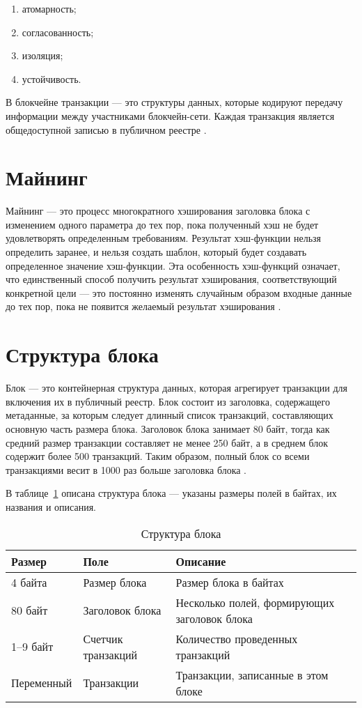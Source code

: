 \begin{enumerate}
\item[1)]
атомарность;
\item[2)]
согласованность;
\item[3)]
изоляция;
\item[4)]
устойчивость.
\end{enumerate}

В блокчейне транзакции --- это структуры данных, которые кодируют передачу информации между участниками блокчейн-сети. 
Каждая транзакция является общедоступной записью в публичном реестре \cite[111]{Antonopoulos2010}.

\section{Майнинг}

Майнинг --- это процесс многократного хэширования заголовка блока с изменением одного параметра до тех пор, пока полученный хэш не будет удовлетворять определенным требованиям. 
Результат хэш-функции нельзя определить заранее, и нельзя создать шаблон, который будет создавать определенное значение хэш-функции. 
Эта особенность хэш-функций означает, что единственный способ получить результат хэширования, соответствующий конкретной цели --- это постоянно изменять случайным образом входные данные до тех пор, пока не появится желаемый результат хэширования \cite[192]{Antonopoulos2010}.

\section{Структура блока}

Блок --- это контейнерная структура данных, которая агрегирует транзакции для включения их в публичный реестр. Блок состоит из заголовка, содержащего метаданные, за которым следует длинный список транзакций, составляющих основную часть размера блока. Заголовок блока занимает 80 байт, тогда как средний размер транзакции составляет не менее 250 байт, а в среднем блок содержит более 500 транзакций. Таким образом, полный блок со всеми транзакциями весит в 1000 раз больше заголовка блока \cite[164]{Antonopoulos2010}.

В таблице~\ref{tabular:blockstructure} описана структура блока --- указаны размеры полей в байтах, их названия и описания.

\begin{table}[H]
\caption{Структура блока}
\label{tabular:blockstructure}
\begin{tabular}{|p{3.5cm}|p{4.5cm}|p{7cm}|}
\hline
\textbf{Размер} & \textbf{Поле} & \textbf{Описание}
\tabularnewline
\hline
4 байта & Размер блока & Размер блока в байтах
\tabularnewline
\hline
80 байт & Заголовок блока & Несколько полей, формирующих заголовок блока
\tabularnewline
\hline
1--9 байт & Счетчик транзакций & Количество проведенных транзакций
\tabularnewline
\hline
Переменный & Транзакции & Транзакции, записанные в этом блоке
\tabularnewline
\hline
\end{tabular}
\end{table}

